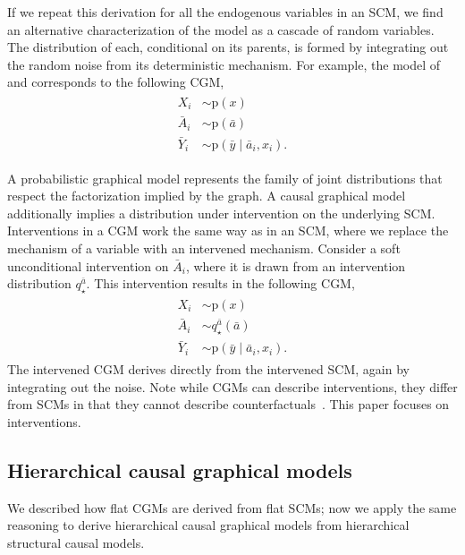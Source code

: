 \documentclass[12pt]{article}
\newcommand{\pr}{\mathrm{p}}
\begin{document}
If we repeat this derivation for all the endogenous variables in an SCM, we find an alternative characterization of the model as a cascade of random variables. The distribution of each, conditional on its parents, is formed by integrating out the random noise from its deterministic mechanism. For example, the model of  and  corresponds to the following CGM,
\begin{align}
  \label{eqn:cgm}
  \begin{split}
    X_i &\sim \pr(x) \\
    \bar{A}_i &\sim \pr(\bar{a}) \\
    \bar{Y}_i  &\sim \pr(\bar{y} \mid \bar{a}_i, x_i).
  \end{split}
\end{align}

A probabilistic graphical model represents the family of joint distributions that respect the factorization implied by the graph. A causal graphical model additionally implies a distribution under intervention on the underlying SCM. Interventions in a CGM work the same way as in an SCM, where we replace the mechanism of a variable with an intervened mechanism. Consider a soft unconditional intervention on $\bar{A}_i$, where it is drawn from an intervention distribution $q_\star^{\bar{a}}$. This intervention results in the following CGM, \begin{align}
  \begin{split}
    X_i &\sim \pr(x) \\
    \bar{A}_i &\sim q_\star^{\bar{a}}(\bar{a}) \\
    \bar{Y}_i  &\sim \pr(\bar{y} \mid \bar{a}_i, x_i).
  \end{split}
\end{align}
The intervened CGM derives directly from the intervened SCM, again by integrating out the noise. Note while CGMs can describe interventions, they differ from SCMs in that they cannot describe counterfactuals~\citep[Chap. 1]{Pearl2009-fh}. This paper focuses on interventions.

\subsection{Hierarchical causal graphical models} \label{sec:hcgm_ex_derivation}

We described how flat CGMs are derived from flat SCMs; now we apply the same reasoning to derive hierarchical causal graphical models from hierarchical structural causal models.
\end{document}
